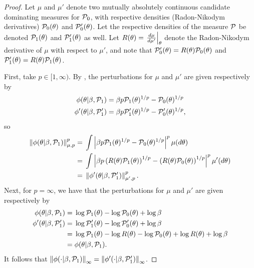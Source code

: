 


\begin{proof}
%
Let $\mu$ and $\mu'$ denote two mutually absolutely continuous candidate
dominating measures for $\mathcal{P}_{0}$, with respective densities (Radon-Nikodym
derivatives) $\mathcal{P}_{0}(\theta)$ and $\mathcal{P}_{0}'(\theta)$.  Let the respective
densities of the measure $\mathcal{P}$ be denoted $\mathcal{P}_{1}(\theta)$ and $\mathcal{P}_{1}'(\theta)$ as
well.  Let $R(\theta) = \left.\frac{d\mu}{d\mu'}\right\vert_{\theta}$ denote the Radon-Nikodym
derivative of $\mu$ with respect to $\mu'$, and note that $\mathcal{P}_{0}'(\theta) =
R(\theta) \mathcal{P}_{0}(\theta)$ and $\mathcal{P}_{1}'(\theta) = R(\theta) \mathcal{P}_{1}(\theta)$.

First, take $p \in [1, \infty)$.  By , the perturbations
for $\mu$ and $\mu'$ are given respectively by
%
\begin{align*}
%
\phi(\theta \vert \beta, \palt) ={}&
    \beta p \palt(\theta)^{1/p} - \pbase(\theta)^{1/p}\\
\phi'(\theta \vert \beta, \palt') ={}&
    \beta p \palt'(\theta)^{1/p} - \pbase'(\theta)^{1/p},
%
\end{align*}
%
so
%
\begin{align*}
%
\norm{\phi(\theta \vert \beta, \palt)}_{\mu,p}^p ={}&
\int \abs{\beta p \palt(\theta)^{1/p} - \pbase(\theta)^{1/p}}^p
    \mu(d\theta)
%
\\={}&
\int \abs{\beta p \left(R(\theta) \palt(\theta)\right)^{1/p} -
          \left(R(\theta) \pbase(\theta)\right)^{1/p}}^p
     \mu'(d\theta)
%
\\={}&
\norm{\phi'(\theta \vert \beta, \palt')}_{\mu',p}^p.
%
\end{align*}
%
Next, for $p = \infty$, we have that the perturbations for $\mu$ and $\mu'$ are
given respectively by
%
\begin{align*}
%
\phi(\theta \vert \beta, \palt) ={}&
  \log \palt(\theta) - \log \pbase(\theta) + \log \beta \\
\phi'(\theta \vert \beta, \palt') ={}&
    \log \palt'(\theta) - \log \pbase'(\theta) + \log \beta
\\={}&
\log \palt(\theta) - \log R(\theta)
    - \log \pbase(\theta) + \log R(\theta)+ \log \beta
\\={}&
\phi(\theta \vert \beta, \palt).
%
\end{align*}
%
It follows that $\left\Vert\phi(\cdot \vert \beta, \mathcal{P}_{1})\right\Vert_{\infty} = \left\Vert\phi'(\cdot
\vert \beta, \mathcal{P}_{1}')\right\Vert_{\infty}$.


\end{proof}
